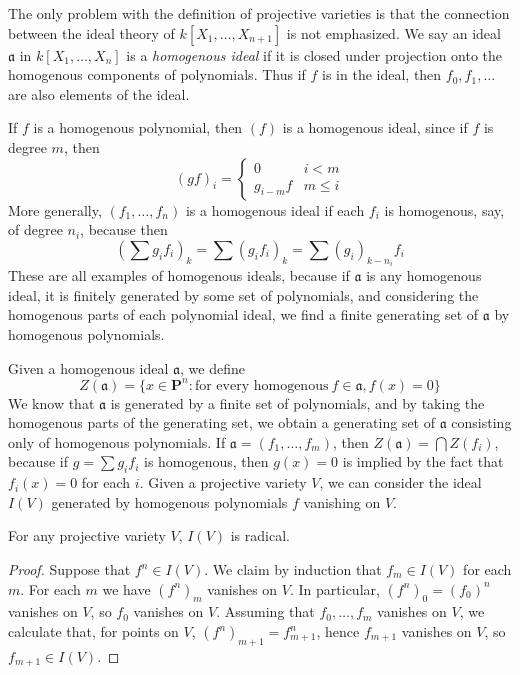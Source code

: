 The only problem with the definition of projective varieties is that the connection between the ideal theory of $k[X_1, \dots, X_{n+1}]$ is not emphasized. We say an ideal $\mathfrak{a}$ in $k[X_1, \dots, X_n]$ is a \emph{homogenous ideal} if it is closed under projection onto the homogenous components of polynomials. Thus if $f$ is in the ideal, then $f_0, f_1, \dots$ are also elements of the ideal.

\begin{example}
    If $f$ is a homogenous polynomial, then $(f)$ is a homogenous ideal, since if $f$ is degree $m$, then
    \[ (gf)_i = \begin{cases} 0 & i < m \\ g_{i-m}f & m \leq i \end{cases} \]
    More generally, $(f_1, \dots, f_n)$ is a homogenous ideal if each $f_i$ is homogenous, say, of degree $n_i$, because then
    \[ \left(\sum g_if_i \right)_k = \sum (g_if_i)_k = \sum (g_i)_{k - n_i} f_i \]
    These are all examples of homogenous ideals, because if $\mathfrak{a}$ is any homogenous ideal, it is finitely generated by some set of polynomials, and considering the homogenous parts of each polynomial ideal, we find a finite generating set of $\mathfrak{a}$ by homogenous polynomials.
\end{example}

Given a homogenous ideal $\mathfrak{a}$, we define
%
\[ Z(\mathfrak{a}) = \{ x \in \mathbf{P}^n: \text{for every homogenous}\ f \in \mathfrak{a}, f(x) = 0 \} \]
%
We know that $\mathfrak{a}$ is generated by a finite set of polynomials, and by taking the homogenous parts of the generating set, we obtain a generating set of $\mathfrak{a}$ consisting only of homogenous polynomials. If $\mathfrak{a} = (f_1, \dots, f_m)$, then $Z(\mathfrak{a}) = \bigcap Z(f_i)$, because if $g = \sum g_i f_i$ is homogenous, then $g(x) = 0$ is implied by the fact that $f_i(x) = 0$ for each $i$. Given a projective variety $V$, we can consider the ideal $I(V)$ generated by homogenous polynomials $f$ vanishing on $V$.

\begin{theorem}
    For any projective variety $V$, $I(V)$ is radical.
\end{theorem}
\begin{proof}
    Suppose that $f^n \in I(V)$. We claim by induction that $f_m \in I(V)$ for each $m$. For each $m$ we have $(f^n)_m$ vanishes on $V$. In particular, $(f^n)_0 = (f_0)^n$ vanishes on $V$, so $f_0$ vanishes on $V$. Assuming that $f_0, \dots, f_m$ vanishes on $V$, we calculate that, for points on $V$, $(f^n)_{m+1} = f_{m+1}^n$, hence $f_{m+1}$ vanishes on $V$, so $f_{m+1} \in I(V)$.
\end{proof}

